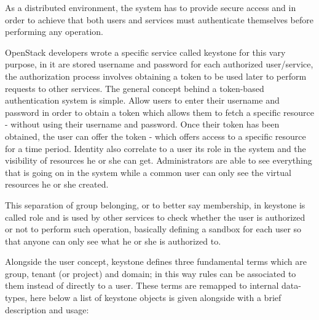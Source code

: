 As a distributed environment, the system has to provide secure access and in order to achieve that both users and services must authenticate themselves before performing any operation.

OpenStack developers wrote a specific service called keystone for this vary purpose, in it are stored username and password for each authorized user/service, the authorization process involves obtaining a token to be used later to perform requests to other services. The general concept behind a token-based authentication system is simple. Allow users to enter their username and password in order to obtain a token which allows them to fetch a specific resource - without using their username and password. Once their token has been obtained, the user can offer the token - which offers access to a specific resource for a time period. Identity also correlate to a user its role in the system and the visibility of resources he or she can get. Administrators are able to see everything that is going on in the system while a common user can only see the virtual resources he or she created.

This separation of group belonging, or to better say membership, in keystone is called role and is used by other services to check whether the user is authorized or not to perform such operation, basically defining a sandbox for each user so that anyone can only see what he or she is authorized to.

Alongside the user concept, keystone defines three fundamental terms which are group, tenant (or project) and domain; in this way rules can be associated to them instead of directly to a user. These terms are remapped to internal data-types, here below a list of keystone objects is given alongside with a brief description and usage:

